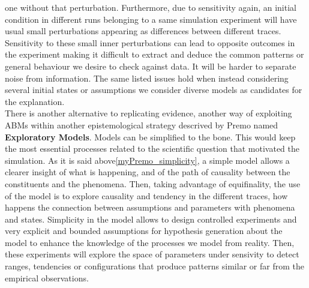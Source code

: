 \documentclass[11pt,oneside,a4paper,openright]{report}
\begin{document}
one without that perturbation. Furthermore, due to sensitivity again, an initial condition in different runs belonging to a same simulation experiment will have usual small perturbations appearing as differences between different traces. Sensitivity to these small inner perturbations can lead to opposite outcomes in the experiment making it difficult to extract and deduce the common patterns or general behaviour we desire to check against data. It will be harder to separate noise from information. The same listed issues hold when instead considering several initial states or assumptions we consider diverse models as candidates for the explanation.\\
%
%
%
% 
%
There is another alternative to replicating evidence, another way of exploiting ABMs within another epistemological strategy descrived by Premo \cite[p.33-34]{Premo2010} named \textbf{Exploratory Models}. Models can be simplified to the bone. This would keep the most essential processes related to the scientific question that motivated the simulation. As it is said above\ref{myPremo_simplicity}, a simple model allows a clearer insight of what is happening, and of the path of causality between the constituents and the phenomena. Then, taking advantage of equifinality, the use of the model is to explore causality and tendency in the different traces, how happens the connection between assumptions and parameters with phenomena and states. Simplicity in the model allows to design controlled experiments and very explicit and bounded assumptions for hypothesis generation about the model to enhance the knowledge of the processes we model from reality. Then, these experiments will explore the space of parameters under sensivity to detect ranges, tendencies or configurations that produce patterns similar or far from the empirical observations.\\ 
\end{document}
